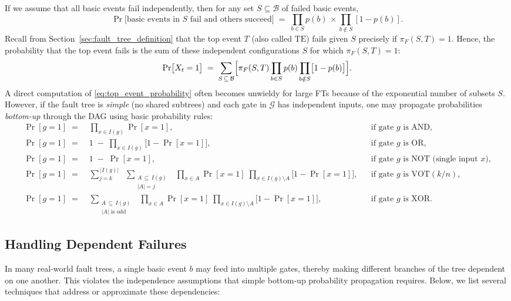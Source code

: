 If we assume that all basic events fail independently, then for any set \(S \subseteq \mathcal{B}\) of failed basic events,
\[
\Pr\bigl[\text{basic events in }S\text{ fail and others succeed}\bigr]
\;=\;
\prod_{b \in S} p(b)\,\times\!\!\prod_{b \notin S} [1 - p(b)].
\]
Recall from Section~\ref{sec:fault_tree_definition} that the top event \(T\) (also called \(\mathrm{TE}\)) fails given \(S\) precisely if \(\pi_F(S, T)=1\).  Hence, the probability that the top event fails is the sum of these independent configurations \(S\) for which \(\pi_F(S,T)=1\):
\begin{equation}
\label{eq:top_event_probability}
\Pr\bigl[X_t=1\bigr]
\;=\;
\sum_{S\,\subseteq\,\mathcal{B}}
\Bigl[
    \pi_F(S,T)
    \prod_{b \in S} p(b)
    \prod_{b \notin S} \bigl[1 - p(b)\bigr]
\Bigr].
\end{equation}
A direct computation of \eqref{eq:top_event_probability} often becomes unwieldy for large FTs because of the exponential number of subsets \(S\).  However, if the fault tree is \emph{simple} (no shared subtrees) and each gate in \(\mathcal{G}\) has independent inputs, one may propagate probabilities \emph{bottom-up} through the DAG using basic probability rules:
\[
\begin{aligned}
\Pr[g=1] \;=\;& \prod_{x \in I(g)} \Pr[x=1],
&&\text{if gate \(g\) is AND,}\\[6pt]
\Pr[g=1] \;=\;& 1 \;-\; \prod_{x \in I(g)}\bigl[1-\Pr[x=1]\bigr],
&&\text{if gate \(g\) is OR,}\\[6pt]
\Pr[g=1] \;=\;& 1 \;-\; \Pr[x=1],
&&\text{if gate \(g\) is NOT (single input \(x\)),}\\[6pt]
\Pr[g=1] \;=\;& \displaystyle \sum_{j=k}^{\,|I(g)|}
\;\;\sum_{\substack{A\,\subseteq\,I(g)\\|A|=j}}
\;\;\prod_{x\in A}\Pr[x=1]\;\prod_{x\in I(g)\setminus A}\bigl[1-\Pr[x=1]\bigr],
&&\text{if gate \(g\) is \(\mathrm{VOT}(k/n)\),}\\[6pt]
\Pr[g=1] \;=\;& \displaystyle \sum_{\substack{A\,\subseteq\,I(g)\\\text{\(|A|\) is odd}}}
\;\;\prod_{x\in A}\Pr[x=1]\;\prod_{x\in I(g)\setminus A}\bigl[1-\Pr[x=1]\bigr],
&&\text{if gate \(g\) is XOR.}
\end{aligned}
\]

\subsection{Handling Dependent Failures}

In many real-world fault trees, a single basic event \(b\) may feed into multiple gates, thereby making different branches of the tree dependent on one another. This violates the independence assumptions that simple bottom-up probability propagation requires. Below, we list several techniques that address or approximate these dependencies:

